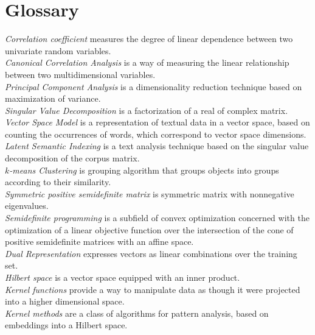 %
\chapter{Glossary}

\emph{Correlation coefficient} measures the degree of linear dependence between two univariate random variables.\\
\emph{Canonical Correlation Analysis} is a way of measuring the linear relationship between two multidimensional variables.\\
\emph{Principal Component Analysis} is a dimensionality reduction technique based on maximization of variance.\\
\emph{Singular Value Decomposition} is a factorization of a real of complex matrix.\\
\emph{Vector Space Model} is a representation of textual data in a vector space, based on counting the occurrences of words, which correspond
to vector space dimensions.\\
\emph{Latent Semantic Indexing} is a text analysis technique based on the singular value decomposition of the corpus matrix.\\
\emph{$k$-means Clustering} is grouping algorithm that groups objects into groups according to their similarity.\\
\emph{Symmetric positive semidefinite matrix} is symmetric matrix with nonnegative eigenvalues.\\
\emph{Semidefinite programming} is a subfield of convex optimization concerned with the optimization of a linear objective function over the intersection of the cone of positive semidefinite matrices with an affine space.\\
\emph{Dual Representation} expresses vectors as linear combinations over the training set.\\
\emph{Hilbert space} is a vector space equipped with an inner product.\\
\emph{Kernel functions} provide a way to manipulate data as though it were projected into a higher dimensional space.\\
\emph{Kernel methods} are a class of algorithms for pattern analysis, based on embeddings into a Hilbert space.\\
